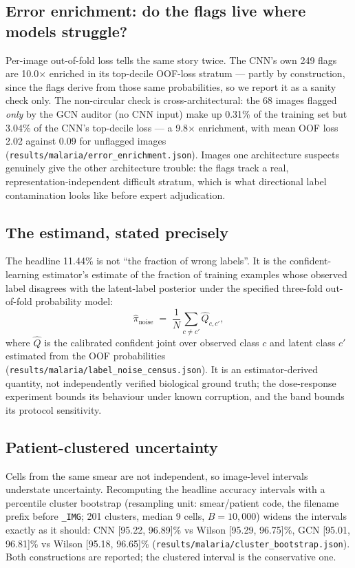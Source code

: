 \subsection{Error enrichment: do the flags live where models struggle?}
\label{sec:enrichment}
Per-image out-of-fold loss tells the same story twice. The CNN's own 249
flags are 10.0$\times$ enriched in its top-decile OOF-loss
stratum --- partly by construction, since the flags derive from those same
probabilities, so we report it as a sanity check only. The non-circular
check is cross-architectural: the 68 images flagged \emph{only}
by the GCN auditor (no CNN input) make up
0.31\% of the training set but
3.04\% of the CNN's top-decile loss --- a
9.8$\times$ enrichment, with mean OOF loss
2.02 against 0.09 for unflagged images
(\texttt{results/malaria/error\_enrichment.json}). Images one architecture
suspects genuinely give the other architecture trouble: the flags track a
real, representation-independent difficult stratum, which is what
directional label contamination looks like before expert adjudication.

\subsection{The estimand, stated precisely}
\label{sec:estimand}
The headline 11.44\% is not ``the fraction of wrong labels''. It is the
confident-learning estimator's estimate of the fraction of training
examples whose observed label disagrees with the latent-label posterior
under the specified three-fold out-of-fold probability model:
\begin{equation}
\hat{\pi}_{\mathrm{noise}} \;=\;
\frac{1}{N}\sum_{c\ne c'} \hat{Q}_{c,c'} ,
\end{equation}
where $\hat{Q}$ is the calibrated confident joint over observed class
$c$ and latent class $c'$ estimated from the OOF probabilities
(\texttt{results/malaria/label\_noise\_census.json}). It is an
estimator-derived quantity, not independently verified biological ground
truth; the dose-response experiment bounds its behaviour under known
corruption, and the band bounds its protocol sensitivity.

\subsection{Patient-clustered uncertainty}
\label{sec:clusterboot}
Cells from the same smear are not independent, so image-level intervals
understate uncertainty. Recomputing the headline accuracy intervals with
a percentile cluster bootstrap (resampling unit: smear/patient code, the
filename prefix before \texttt{\_IMG}; 201 clusters, median 9 cells, $B=10{,}000$)
widens the intervals exactly as it should: CNN [95.22, 96.89]\%
vs Wilson [95.29, 96.75]\%, GCN [95.01, 96.81]\%
vs Wilson [95.18, 96.65]\%
(\texttt{results/malaria/cluster\_bootstrap.json}). Both constructions
are reported; the clustered interval is the conservative one.

